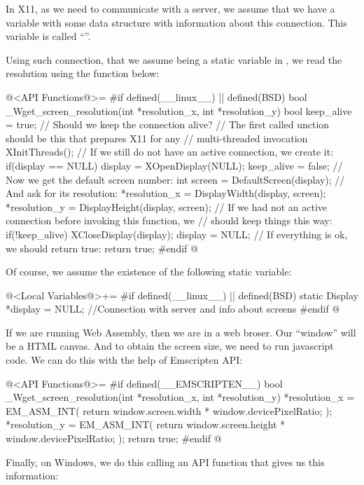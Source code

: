 In X11, as we need to communicate with a server, we assume that we
have a variable with some data structure with information about this
connection. This variable is called ``''.

Using such connection, that we assume being a static variable
in , we read the resolution using the function
below:

\iniciocodigo
@<API Functions@>=
#if defined(__linux__) || defined(BSD)
bool _Wget_screen_resolution(int *resolution_x, int *resolution_y){
  bool keep_alive = true; // Should we keep the connection alive?
  // The first called unction should be this that prepares X11 for any
  // multi-threaded invocation
  XInitThreads();
  // If we still do not have an active connection, we create it:
  if(display == NULL){
    display = XOpenDisplay(NULL);
    keep_alive = false;
  }
  // Now we get the default screen number:
  int screen = DefaultScreen(display);
  // And ask for its resolution:
  *resolution_x = DisplayWidth(display, screen);
  *resolution_y = DisplayHeight(display, screen);
  // If we had not an active connection before invoking this function, we
  // should keep things this way:
  if(!keep_alive){
    XCloseDisplay(display);
    display = NULL;
  }
  // If everything is ok, we should return true:
  return true;
}
#endif
@
\fimcodigo

Of course, we assume the existence of the following static variable:

\iniciocodigo
@<Local Variables@>+=
#if defined(__linux__) || defined(BSD)
static Display *display = NULL; //Connection with server and info about screens
#endif
@
\fimcodigo


If we are running Web Assembly, then we are in a web broser. Our
``window'' will be a HTML canvas. And to obtain the screen size, we
need to run javascript code. We can do this with the help of
Emscripten API:

\iniciocodigo
@<API Functions@>=
#if defined(__EMSCRIPTEN__)
bool _Wget_screen_resolution(int *resolution_x, int *resolution_y){
  *resolution_x = EM_ASM_INT({
    return window.screen.width * window.devicePixelRatio;
  });
  *resolution_y = EM_ASM_INT({
    return window.screen.height * window.devicePixelRatio;
  });
  return true;
}
#endif
@
\fimcodigo



Finally, on Windows, we do this calling an API function that gives us
this information:

